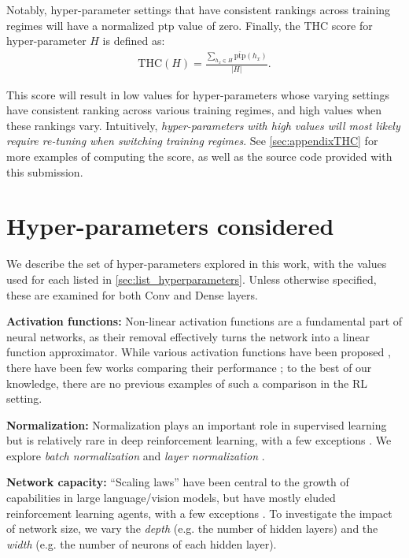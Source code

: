 \documentclass[10pt]{article} %
\begin{document}
Notably, hyper-parameter settings that have consistent rankings across training regimes will have a normalized $\textrm{ptp}$ value of zero. Finally, the $\textrm{THC}$ score for hyper-parameter $H$ is defined as:
\begin{align}
    \textrm{THC}(H) = \frac{\sum_{h_x\in H}\overline{\textrm{ptp}}(h_x)}{|H|}.
    \label{eqn:thc}
\end{align}

This score will result in low values for hyper-parameters whose varying settings have consistent ranking across various training regimes, and high values when these rankings vary. Intuitively, {\em hyper-parameters with high values will most likely require re-tuning when switching training regimes}. See \autoref{sec:appendixTHC} for more examples of computing the score, as well as the source code provided with this submission.



\section{Hyper-parameters considered} 
\label{sec:hyper-parameter_selection}

We describe the set of hyper-parameters explored in this work, with the values used for each listed in \autoref{sec:list_hyperparameters}. Unless otherwise specified, these are examined for both Conv and Dense layers.

{\bf Activation functions:} 
Non-linear activation functions are a fundamental part of neural networks, as their removal effectively turns the network into a linear function approximator.
While various activation functions have been proposed \citep{devlin2019bert, Elfwing2018SigmoidWeightedLU, 10.5555/3305381.3305478}, there have been few works comparing their performance \citep{Shamir2020SmoothAA}; to the best of our knowledge, there are no previous examples of such a comparison in the RL setting.


{\bf Normalization: }
Normalization plays an important role in supervised learning \citep{tan2020efficientnet, xie2017aggregated} but is relatively rare in deep reinforcement learning, with a few exceptions \citep{gogianu2021spectral, bhatt2019crossnorm, arpit2019initialize, alphaZero}. We explore {\em batch normalization} \citep{ioffe2015batch} and {\em layer normalization} \citep{ba2016layer}.

{\bf Network capacity: } 
``Scaling laws'' have been central to the growth of capabilities in large language/vision models, but have mostly eluded reinforcement learning agents, with a few exceptions \citep{schwarzer23a, taiga2022investigating, farebrother2022proto,obando2024mixtures,obandoceron2024pruned,farebrother2024stop}. 
To investigate the impact of network size, we vary the {\em depth} (e.g. the number of hidden layers) and the {\em width} (e.g. the number of neurons of each hidden layer).
\end{document}
